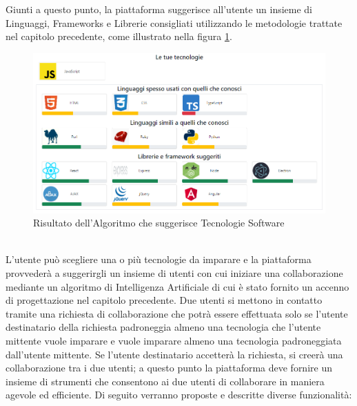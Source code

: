 Giunti a questo punto, la piattaforma suggerisce all'utente un insieme di Linguaggi, Frameworks e Librerie consigliati utilizzando le metodologie trattate nel capitolo precedente, come illustrato nella figura \ref{fig:tecnologie_suggerite}.
\begin{figure}[!htb]
    \includegraphics[width=\textwidth]{capitoli/images/tecnologie_suggerite.png}
    \caption{Risultato dell'Algoritmo che suggerisce Tecnologie Software}
    \label{fig:tecnologie_suggerite}
\end{figure}
\\L'utente può scegliere una o più tecnologie da imparare e la piattaforma provvederà a suggerirgli un insieme di utenti con cui iniziare una collaborazione mediante un algoritmo di Intelligenza Artificiale di cui è stato fornito un accenno di progettazione nel capitolo precedente. Due utenti si mettono in contatto tramite una richiesta di collaborazione che potrà essere effettuata solo se l’utente destinatario della richiesta padroneggia almeno una tecnologia che l’utente mittente vuole imparare e vuole imparare almeno una tecnologia padroneggiata dall’utente mittente. Se l’utente destinatario accetterà la richiesta, si creerà una collaborazione tra i due utenti; a questo punto la piattaforma deve fornire un insieme di strumenti che consentono ai due utenti di collaborare in maniera agevole ed efficiente. 
Di seguito verranno proposte e descritte diverse funzionalità:
